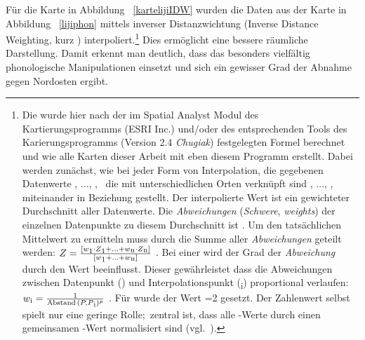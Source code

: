 {\newpage 	 
Für die Karte in Abbildung \,%
\ref{kartelijiIDW} wurden die Daten aus der Karte in Abbildung \,%
 \ref{lijiphon} mittels inverser Distanzwichtung (Inverse Distance Weighting, kurz ) interpoliert.\footnote{Die  wurde hier nach der im Spatial Analyst Modul des Kartierungsprogramms  (ESRI Inc.) und/oder des entsprechenden Tools des Karierungsprogramms  (Version 2.4 \textit{Chugiak}) festgelegten Formel berechnet und wie alle Karten dieser Arbeit mit eben diesem Programm erstellt. Dabei werden zunächst, wie bei jeder Form von Interpolation, die gegebenen Datenwerte  , ...,  , \,%
 die mit unterschiedlichen Orten verknüpft sind , ..., , \,%
 miteinander in Beziehung gestellt. Der interpolierte Wert ist ein gewichteter Durchschnitt aller Datenwerte. Die \textit{Abweichungen} (\textit{Schwere}, \textit{weights}) der einzelnen Datenpunkte zu diesem Durchschnitt ist . Um den tatsächlichen Mittelwert zu ermitteln muss durch die Summe aller \textit{Abweichungen} geteilt werden: 
\begin{math} 
Z = \frac{[w\textsubscript{1} \cdot Z\textsubscript{1} + ... + w\textsubscript{n} \cdot Z\textsubscript{n}]}  {[w\textsubscript{1} + ... + w\textsubscript{n}]}
\end{math}%
. Bei einer  wird der Grad der \textit{Abweichung} durch den Wert  beeinflusst. Dieser gewährleistet dass die Abweichungen zwischen  Datenpunkt () und Interpolationspunkt (\textsubscript{i}) proportional verlaufen: 
\begin{math} w\textsubscript{i} = \frac{1} {\text{Abstand}\,(P, P\textsubscript{i})^p} \end{math} . Für  wurde der Wert =2 gesetzt. Der Zahlenwert selbst spielt nur eine geringe Rolle;\, zentral ist, dass alle -Werte durch einen gemeinsamen -Wert normalisiert sind (vgl.\, \citealt[132–160]{BurroughMcDonnell1998}).} Dies ermöglicht eine bessere räumliche Darstellung. Damit erkennt man deutlich, dass das  besonders vielfältig phonologische Manipulationen einsetzt und sich ein gewisser Grad der Abnahme gegen Nordosten ergibt. 
  






 \begin{figure}[p]
		 

\end{figure}}
